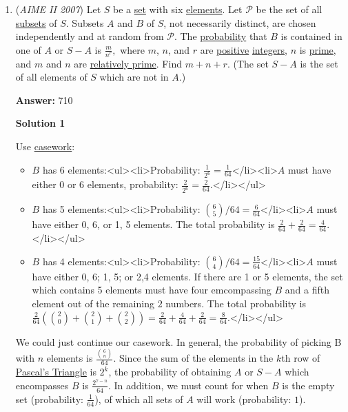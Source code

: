 \begin{enumerate}
	\item (\textit{AIME II 2007}) Let $S$ be a \href{https://artofproblemsolving.com/wiki/index.php?title=Set}{set} with six \href{https://artofproblemsolving.com/wiki/index.php?title=Element}{elements}. Let $\mathcal{P}$ be the set of all \href{https://artofproblemsolving.com/wiki/index.php?title=Subset}{subsets} of $S.$ Subsets $A$ and $B$ of $S$, not necessarily distinct, are chosen independently and at random from $\mathcal{P}$. The \href{https://artofproblemsolving.com/wiki/index.php?title=Probability}{probability} that $B$ is contained in one of $A$ or $S-A$ is $\frac{m}{n^{r}},$ where $m$, $n$, and $r$ are \href{https://artofproblemsolving.com/wiki/index.php?title=Positive}{positive} \href{https://artofproblemsolving.com/wiki/index.php?title=Integer}{integers}, $n$ is \href{https://artofproblemsolving.com/wiki/index.php?title=Prime}{prime}, and $m$ and $n$ are \href{https://artofproblemsolving.com/wiki/index.php?title=Relatively\_prime}{relatively prime}. Find $m+n+r.$ (The set $S-A$ is the set of all elements of $S$ which are not in $A.$)


 
 \textbf{Answer: }710



\textbf{Solution 1}

Use \href{https://artofproblemsolving.com/wiki/index.php?title=Casework}{casework}:

 
            \begin{itemize}
        \item $B$ has 6 elements:<ul><li>Probability: $\frac{1}{2^6} = \frac{1}{64}$</li><li>$A$ must have either 0 or 6 elements, probability: $\frac{2}{2^6} = \frac{2}{64}$.</li></ul>
        \item $B$ has 5 elements:<ul><li>Probability: ${6\choose5}/64 = \frac{6}{64}$</li><li>$A$ must have either 0, 6, or 1, 5 elements. The total probability is $\frac{2}{64} + \frac{2}{64} = \frac{4}{64}$.</li></ul>
        \item $B$ has 4 elements:<ul><li>Probability: ${6\choose4}/64 = \frac{15}{64}$</li><li>$A$ must have either 0, 6; 1, 5; or 2,4 elements. If there are 1 or 5 elements, the set which contains 5 elements must have four emcompassing $B$ and a fifth element out of the remaining $2$ numbers. The total probability is $\frac{2}{64}\left({2\choose0} + {2\choose1} + {2\choose2}\right) = \frac{2}{64} + \frac{4}{64} + \frac{2}{64} = \frac{8}{64}$.</li></ul>
            \end{itemize}
            We could just continue our casework. In general, the probability of picking B with $n$ elements is $\frac{{6\choose n}}{64}$. Since the sum of the elements in the $k$th row of \href{https://artofproblemsolving.com/wiki/index.php?title=Pascal\%27s\_Triangle}{Pascal's Triangle} is $2^k$, the probability of obtaining $A$ or $S-A$ which encompasses $B$ is $\frac{2^{7-n}}{64}$. In addition, we must count for when $B$ is the empty set (probability: $\frac{1}{64}$), of which all sets of $A$ will work (probability: $1$).


\end{enumerate}
